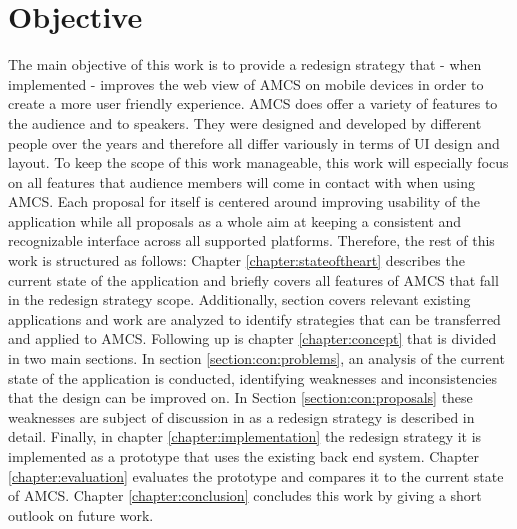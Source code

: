 \section{Objective}
\label{section:intro:objective}
The main objective of this work is to provide a redesign strategy that - when implemented - improves the web view of AMCS on mobile devices in order to create a more user friendly experience. AMCS does offer a variety of features to the audience and to speakers. They were designed and developed by different people over the years and therefore all differ  variously in terms of UI design and layout.
To keep the scope of this work manageable, this work will especially focus on all features that audience members will come in contact with when using AMCS.
Each proposal for itself is centered around improving usability of the application while all proposals as a whole aim at keeping a consistent and recognizable interface across all supported platforms.  Therefore, the rest of this work is structured as follows:
\newline
\newline
Chapter \ref{chapter:stateoftheart} describes the current state of the application and briefly covers all features of AMCS that fall in the redesign strategy scope.
Additionally, section \todosct covers relevant existing applications and work are analyzed to identify strategies that can be transferred and applied to AMCS.
\newline
\newline
Following up is chapter \ref{chapter:concept} that is divided in two main sections. In section \ref{section:con:problems}, an analysis of the current state of the application is conducted, identifying weaknesses and inconsistencies that the design can be improved on.
In Section \ref{section:con:proposals} these weaknesses are subject of discussion in as a redesign strategy is described in detail.
\newline
\newline
Finally, in chapter \ref{chapter:implementation} the redesign strategy it is implemented as a prototype that uses the existing back end system.
Chapter \ref{chapter:evaluation} evaluates the prototype and compares it to the current state of AMCS.
\newline
\newline
Chapter \ref{chapter:conclusion} concludes this work by giving a short outlook on future work.
